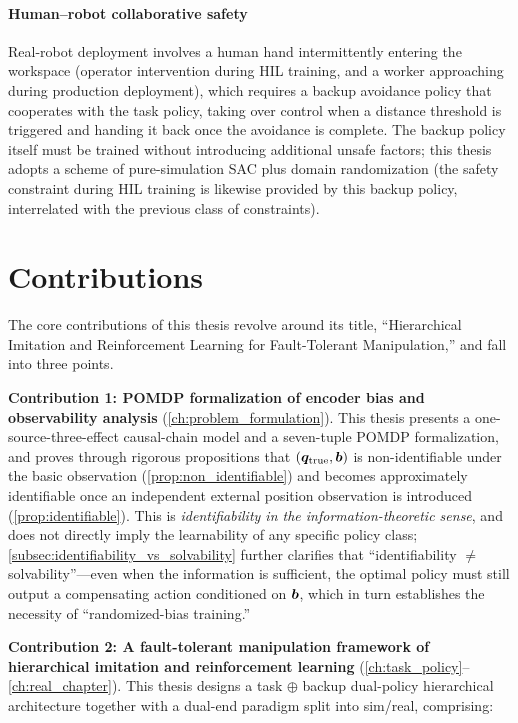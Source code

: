 \paragraph{Human--robot collaborative safety} Real-robot deployment involves a human hand intermittently entering the workspace (operator intervention during HIL training, and a worker approaching during production deployment), which requires a backup avoidance policy that cooperates with the task policy, taking over control when a distance threshold is triggered and handing it back once the avoidance is complete. The backup policy itself must be trained without introducing additional unsafe factors; this thesis adopts a scheme of pure-simulation SAC plus domain randomization (the safety constraint during HIL training is likewise provided by this backup policy, interrelated with the previous class of constraints).

\section{Contributions}\label{sec:contributions}

The core contributions of this thesis revolve around its title, ``Hierarchical Imitation and Reinforcement Learning for Fault-Tolerant Manipulation,'' and fall into three points.

\textbf{Contribution 1: POMDP formalization of encoder bias and observability analysis} (\cref{ch:problem_formulation}). This thesis presents a one-source-three-effect causal-chain model and a seven-tuple POMDP formalization, and proves through rigorous propositions that $(\bm{q}_{\text{true}}, \bm{b})$ is non-identifiable under the basic observation (\cref{prop:non_identifiable}) and becomes approximately identifiable once an independent external position observation is introduced (\cref{prop:identifiable}). This is \emph{identifiability in the information-theoretic sense}, and does not directly imply the learnability of any specific policy class; \cref{subsec:identifiability_vs_solvability} further clarifies that ``identifiability $\neq$ solvability''---even when the information is sufficient, the optimal policy must still output a compensating action conditioned on $\bm{b}$, which in turn establishes the necessity of ``randomized-bias training.''

\textbf{Contribution 2: A fault-tolerant manipulation framework of hierarchical imitation and reinforcement learning} (\cref{ch:task_policy}--\cref{ch:real_chapter}). This thesis designs a task $\oplus$ backup dual-policy hierarchical architecture together with a dual-end paradigm split into sim/real, comprising:

